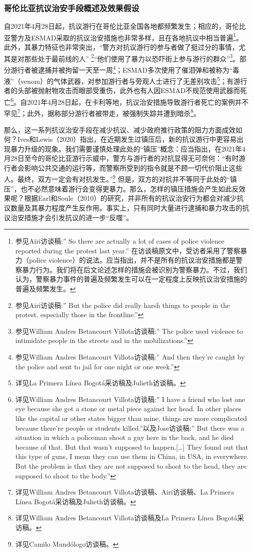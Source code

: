 \documentclass{phyasgn}\usepackage{nag}
\begin{document}
\subsubsection{哥伦比亚抗议治安手段概述及效果假设}
自2021年4月28日起，抗议游行在哥伦比亚全国各地都频繁发生；相应的，哥伦比亚警方及ESMAD采取的抗议治安措施也非常多样，且在各地抗议中相当普遍\footnote[56]{参见Airi访谈稿:” So there are actually a lot of cases of police violence reported during the protest last year.” 在访谈稿原文中，受访者采用了警察暴力（police violence）的说法。应当指出，并不是所有的抗议治安措施都是警察暴力行为。我们将在后文论述怎样的措施会被识别为警察暴力。不过，我们认为，警察暴力事件的普遍及频繁发生可以在一定程度上反映抗议治安措施的普遍及频繁发生。}。此外，其暴力特征也非常突出，“警方对抗议游行的参与者做了挺过分的事情，尤其是对那些处于最前线的人” \footnote[57]{参见Airi访谈稿:” But the police did really harsh things to people in the protest, especially those in the frontline.”}“他们使用了暴力以恐吓街上参与游行的群众”\footnote[58]{参见William Andres Betancourt Villota访谈稿:” The police used violence to intimidate people in the streets and in the mobilizations.”}。部分游行者被逮捕并被拘留一天至一周\footnote[59]{参见William Andres Betancourt Villota访谈稿:” And then they’re caught by the police and sent to jail for one night or one week.”}；ESMAD多次使用了催泪弹和被称为“毒液”（venom）的气体武器，对参加游行者与旁观人士进行了无差别攻击\footnote[60]{详见La Primera Línea Bogotá采访稿及Julieth访谈稿。}；有游行者的头部被抛射物攻击而眼部受重伤，此外也有人因ESMAD不规范使用武器而死亡\footnote[61]{详见William Andres Betancourt Villota访谈稿:” I have a friend who lost one eye because she got a stone or metal piece against her head. In other places like the capital or other states bigger than mine, things are more complicated because there’re people or students killed.”以及Jose访谈稿:” But there was a situation in which a policeman shoot a guy here in the back, and he died because of that. But that wasn't supposed to happen.[…] They found out that this type of guns, I mean they can use them in China, in USA, in everywhere. But the problem is that they are not supposed to shoot to the head, they are supposed to shoot to the body.”}。自2021年4月28日起，在卡利等地，抗议治安措施导致游行者死亡的案例并不罕见\footnote[62]{详见William Andres Betancourt Villota访谈稿、Airi访谈稿、La Primera Línea Bogotá采访稿及Julieth访谈稿。}；此外，据称部分游行者被带走，被强制失踪并遭到暗杀\footnote[63]{详见William Andres Betancourt Villota访谈稿及La Primera Línea Bogotá采访稿。}。
\par 那么，这一系列抗议治安手段在减少抗议、减少政府推行政策的阻力方面成效如何？Ives和Lewis（2020）指出，在近期发生过镇压后，新的抗议游行中更容易出现暴力升级的现象。我们需要谨慎处理此处的“镇压”概念：应当指出，在2021年4月28日至今的哥伦比亚游行示威中，警方与游行者的对抗显得无可奈何：“有时游行者会影响公共交通的运行等，而警察所受到的指令就是不顾一切代价阻止这些人。最终，双方一定会有对抗发生。”\footnote[64]{详见Camilo Mundólogo访谈稿。} 但是，双方的对抗并不等同于此处的“镇压”，也不必然意味着游行会变得更暴力。那么，怎样的镇压措施会产生如此反效果呢？根据Earl和Soule（2010）的研究，并非所有的抗议治安行为都会对减少抗议数量及其暴力程度产生反作用。事实上，只有同时大量进行逮捕和暴力攻击的抗议治安措施才会引发抗议的进一步“反噬”。
\end{document}
